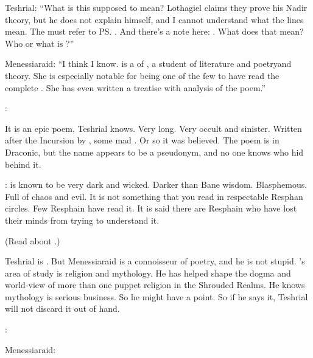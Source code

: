 Teshrial:
``What is this supposed to mean?
  Lothagiel claims they prove his Nadir theory, but he does not explain himself, and I cannot understand what the lines mean. 
  The  must refer to \ps{\Ishnaruchaefir} \vertex. 
  And there's a note here: 
  .
  What does that mean? 
  Who or what is \Urizeth?''

Menessiaraid:
``I think I know. \Urizeth is a \thelyad \resvil of \TiphredSerah, a student of literature and poetry\prikker and \matrix theory.  
  She is especially notable for being one of the few \resphain to have read the complete \WanderersInDarknessEmph.
  She has even written a treatise with analysis of the poem.''

\Teshrial:

It is an epic poem, Teshrial knows. 
Very long. 
Very occult and sinister. 
Written after the Incursion by \Melcryth, some mad \dragon.
Or so it was believed.
The poem is in Draconic, but the name \quo{\Melcryth} appears to be a pseudonym, and no one knows who hid behind it. 

\Menessiaraid:
\WanderersInDarknessEmph is known to be very dark and wicked. 
Darker than Bane wisdom. 
Blasphemous. 
Full of chaos and evil. 
It is not something that you read in respectable Resphan circles. 
Few Resphain have read it. 
It is said there are Resphain who have lost their minds from trying to understand it. 

(Read about .)

Teshrial is \skeptical. 
But Menessiaraid is a connoisseur of poetry, and he is not stupid. 
\Menessiaraid{}'s area of study is religion and mythology.
He has helped shape the dogma and world-view of more than one puppet religion in the Shrouded Realms.
He knows mythology is serious business.
So he might have a point.
So if he says it, Teshrial will not discard it out of hand.

\Teshrial: 
  
Menessiaraid:

